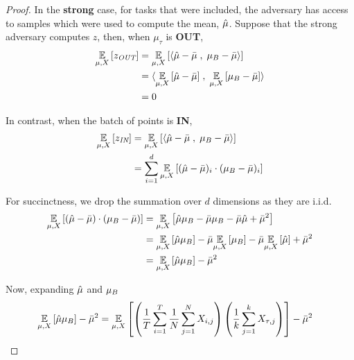 \begin{proof}
In the \textbf{strong} case, for tasks that were included, the adversary has access to samples which were used to compute the mean, $\hat{\mu}$. Suppose that the strong adversary computes $z$, then, when $\mu_\tau$ is \textbf{OUT},
\begin{align*}
    \ex{\mu, X}{z_{\textit{OUT}}} &= \ex{\mu, X}{\inn{\muhat - \mubar}{\muB - \mubar}} \\
    &= \inn{\ex{\mu, X}{\muhat - \mubar}}{\ex{\mu, X}{\muB - \mubar}} \\ 
    &= 0
\end{align*}

In contrast, when the batch of points is \textbf{IN}, 
\begin{align*}
    \ex{\mu, X}{z_{\textit{IN}}} &= \ex{\mu, X}{\inn{\muhat- \mubar}{\muB - \mubar}} \\ 
    &= \sum_{i=1}^{d} \ex{\mu, X}{(\muhat- \mubar)_i \cdot (\muB - \mubar)_i} \\ 
\end{align*}

\noindent For succinctness, we drop the summation over $d$ dimensions as they are i.i.d. 
\begin{align*}
    \ex{\mu, X}{(\muhat - \mubar) \cdot (\muB - \mubar)} &= \ex{\mu, X}{\muhat\muB - \mubar\muB - \mubar\muhat + \mubar^{2}} \\
    &= \ex{\mu, X}{\muhat \muB} - \mubar \ex{\mu, X}{\muB} - \mubar \ex{\mu, X}{\muhat} + \mubar^{2} \\ 
    &= \ex{\mu, X}{\muhat \muB} - \mubar^2 
\end{align*}

\noindent Now, expanding $\hat{\mu}$ and $\mu_B$
\begin{align*}
\ex{\mu, X}{\muhat \muB} - \mubar^2  &= \ex{\mu, X}{\left( \frac{1}{T} \sum_{i=1}^{T}  \frac{1}{N} \sum_{j=1}^{N} X_{i,j} \right) \left( \frac{1}{k} \sum_{j=1}^{k} X_{\tau , j} \right) } - \mubar^2 
\end{align*}



\end{proof}
